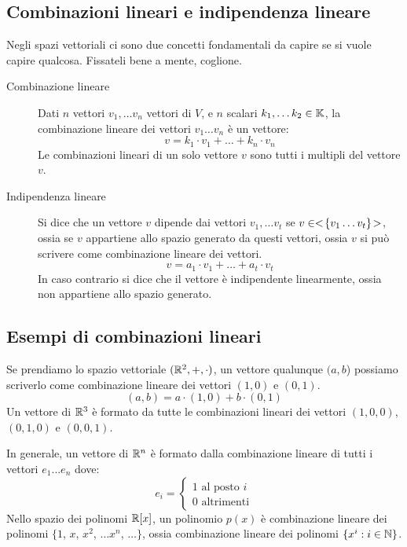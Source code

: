 \subsection{Combinazioni lineari e indipendenza lineare}

Negli spazi vettoriali ci sono due concetti fondamentali da capire se si vuole capire qualcosa. Fissateli bene a mente, coglione.

\begin{description}
    \item[Combinazione lineare] Dati $n$ vettori $v_1, \dots v_n$ vettori di $V$, e $n$ scalari $k_1, \dots k_2 \in \mathbb{K}$, la combinazione lineare dei vettori $v_1 \dots v_n$ \`e un vettore:
    \[
    v = k_1 \cdot v_1 + \dots + k_n \cdot v_n
    \]
    Le combinazioni lineari di un solo vettore $v$ sono tutti i multipli del vettore $v$.
    \item[Indipendenza lineare] Si dice che un vettore $v$ dipende dai vettori $v_1, \dots v_t$ se $v \in <\!{\{v_1 \dots v_t\}}\!>$, ossia se $v$ appartiene allo spazio generato da questi vettori, ossia $v$ si pu\`o scrivere come combinazione lineare dei vettori.
    \[
    v = a_1 \cdot v_1 + \dots + a_t \cdot v_t
    \]
    In caso contrario si dice che il vettore \`e indipendente linearmente, ossia non appartiene allo spazio generato.
\end{description}

\subsection{Esempi di combinazioni lineari}

Se prendiamo lo spazio vettoriale $(\mathbb{R}^2, +, \cdot)$, un vettore qualunque $(a,b$) possiamo scriverlo come combinazione lineare dei vettori $(1,0)$ e $(0,1)$.
\[
(a,b) = a \cdot (1, 0) + b \cdot (0, 1)
\]
Un vettore di $\mathbb{R}^3$ \`e formato da tutte le combinazioni lineari dei vettori $(1,0,0)$, $(0,1,0)$ e $(0,0,1)$.

In generale, un vettore di $\mathbb{R}^n$ \`e formato dalla combinazione lineare di tutti i vettori $e_1 \dots e_n$ dove:
\[
e_i =
\begin{cases}
1 \text{ al posto } i \\
0 \text{ altrimenti}
\end{cases}
\]
Nello spazio dei polinomi $\mathbb{R}[x]$, un polinomio $p(x)$ \`e combinazione lineare dei polinomi $\{ 1$, $x$, $x^2$, $\dots x^n$, $\dots \}$, ossia combinazione lineare dei polinomi $\{ x^i : i \in \mathbb{N} \}$.


